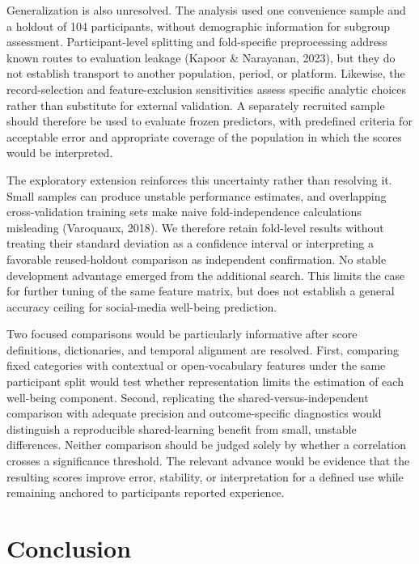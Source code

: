 \documentclass[11pt,letterpaper]{article}
\begin{document}
Generalization is also unresolved. The analysis used one convenience sample and a holdout of 104 participants, without demographic information for subgroup assessment. Participant-level splitting and fold-specific preprocessing address known routes to evaluation leakage (Kapoor \& Narayanan, 2023), but they do not establish transport to another population, period, or platform. Likewise, the record-selection and feature-exclusion sensitivities assess specific analytic choices rather than substitute for external validation. A separately recruited sample should therefore be used to evaluate frozen predictors, with predefined criteria for acceptable error and appropriate coverage of the population in which the scores would be interpreted.

The exploratory extension reinforces this uncertainty rather than resolving it. Small samples can produce unstable performance estimates, and overlapping cross-validation training sets make naive fold-independence calculations misleading (Varoquaux, 2018). We therefore retain fold-level results without treating their standard deviation as a confidence interval or interpreting a favorable reused-holdout comparison as independent confirmation. No stable development advantage emerged from the additional search. This limits the case for further tuning of the same feature matrix, but does not establish a general accuracy ceiling for social-media well-being prediction.

Two focused comparisons would be particularly informative after score definitions, dictionaries, and temporal alignment are resolved. First, comparing fixed categories with contextual or open-vocabulary features under the same participant split would test whether representation limits the estimation of each well-being component. Second, replicating the shared-versus-independent comparison with adequate precision and outcome-specific diagnostics would distinguish a reproducible shared-learning benefit from small, unstable differences. Neither comparison should be judged solely by whether a correlation crosses a significance threshold. The relevant advance would be evidence that the resulting scores improve error, stability, or interpretation for a defined use while remaining anchored to participants\textquotesingle{} reported experience.

\section{Conclusion}\label{conclusion}
\end{document}
